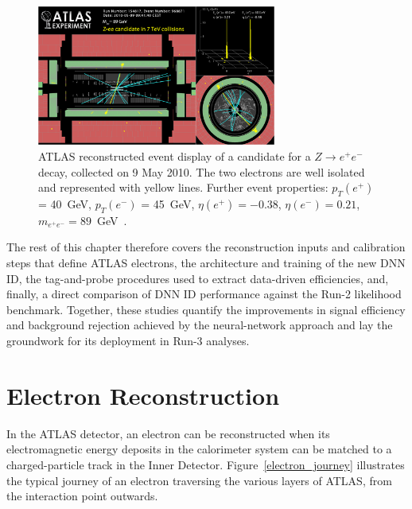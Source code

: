 \begin{figure}[htbp]
    \centering
    \includegraphics[width=0.7\textwidth]{images/Zee.png}
    \caption{ATLAS reconstructed event display of a candidate for a $Z\to e^+e^-$ decay, collected on 9 May 2010. The two electrons are well isolated and represented with yellow lines. Further event properties: $p_{T}(e^{+})$ = 40~GeV, $p_{T}(e^{-})$ = 45~GeV, $\eta(e^{+}) = -0.38$, $\eta(e^{-}) = 0.21$, $m_{e^{+}e^{-}}=89$~GeV~\cite{atlas:eventdisplay}. }
    \label{fig:zee}
\end{figure}

The rest of this chapter therefore covers the reconstruction inputs and calibration steps that define ATLAS electrons, the architecture and training of the new DNN ID, the tag-and-probe procedures used to extract data-driven efficiencies, and, finally, a direct comparison of DNN ID performance against the Run-2 likelihood benchmark. Together, these studies quantify the improvements in signal efficiency and background rejection achieved by the neural-network approach and lay the groundwork for its deployment in Run-3 analyses.  

\section{Electron Reconstruction}

In the ATLAS detector, an electron can be reconstructed when its electromagnetic energy deposits in the calorimeter system can be matched to a charged-particle track in the Inner Detector. Figure~\ref{electron_journey} illustrates the typical journey of an electron traversing the various layers of ATLAS, from the interaction point outwards.

